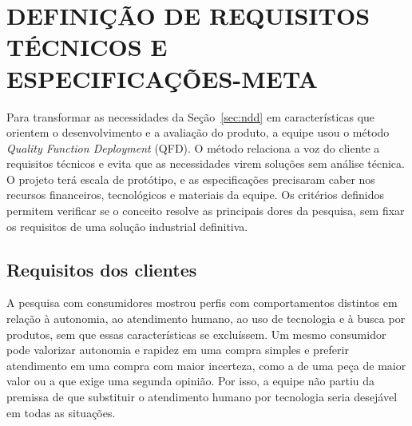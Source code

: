 
\section[DEFINIÇÃO DE REQUISITOS TÉCNICOS E ESPECIFICAÇÕES-META]{DEFINIÇÃO DE REQUISITOS TÉCNICOS E\\ESPECIFICAÇÕES-META}
\label{sec:definicao_requisitos}

Para transformar as necessidades da Seção~\ref{sec:ndd} em características que orientem o desenvolvimento e a avaliação do produto, a equipe usou o método \textit{Quality Function Deployment} (QFD). O método relaciona a voz do cliente a requisitos técnicos e evita que as necessidades virem soluções sem análise técnica. O projeto terá escala de protótipo, e as especificações precisaram caber nos recursos financeiros, tecnológicos e materiais da equipe. Os critérios definidos permitem verificar se o conceito resolve as principais dores da pesquisa, sem fixar os requisitos de uma solução industrial definitiva.

\subsection{Requisitos dos clientes}
\label{subsec:requisitos_dos_clientes}

A pesquisa com consumidores mostrou perfis com comportamentos distintos em relação à autonomia, ao atendimento humano, ao uso de tecnologia e à busca por produtos, sem que essas características se excluíssem. Um mesmo consumidor pode valorizar autonomia e rapidez em uma compra simples e preferir atendimento em uma compra com maior incerteza, como a de uma peça de maior valor ou a que exige uma segunda opinião. Por isso, a equipe não partiu da premissa de que substituir o atendimento humano por tecnologia seria desejável em todas as situações.

